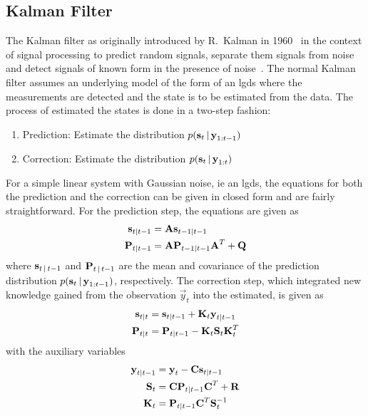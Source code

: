 	\subsection{Kalman Filter}
		The Kalman filter as originally introduced by R.~Kalman in 1960~\cite{kalmanNewApproachLinear1960} in the context of signal processing to predict random signals, separate them signals from noise and detect signals of known form in the presence of noise~\cite{kalmanNewApproachLinear1960}. The normal Kalman filter assumes an underlying model of the form of an \ac{lgds} where the measurements are detected and the state is to be estimated from the data. The process of estimated the states is done in a two-step fashion:
		\begin{enumerate}
			\item Prediction: \tabto{2.5cm} Estimate the distribution \( p(\boldsymbol{\mathrm{s}}_t \,\vert\, \boldsymbol{\mathrm{y}}_{1:t - 1}) \)
			\item Correction: \tabto{2.5cm} Estimate the distribution \( p(\boldsymbol{\mathrm{s}}_t \,\vert\, \boldsymbol{\mathrm{y}}_{1:t}) \)
		\end{enumerate}
		For a simple linear system with Gaussian noise, \ac{ie} an \ac{lgds}, the equations for both the prediction and the correction can be given in closed form and are fairly straightforward. For the prediction step, the equations are given as
		\begin{align}
			\boldsymbol{\mathrm{s}}_{t \vert t - 1} &= \boldsymbol{\mathrm{A}} \boldsymbol{\mathrm{s}}_{t - 1 \vert t - 1}  \label{eqn:kfStatePre} \\
			\boldsymbol{\mathrm{P}}_{t \vert t - 1} &= \boldsymbol{\mathrm{A}} \boldsymbol{\mathrm{P}}_{t - 1 \vert t - 1} \boldsymbol{\mathrm{A}}^T + \boldsymbol{\mathrm{Q}}  \label{eqn:kfCovPre}
		\end{align}
		where \( \boldsymbol{\mathrm{s}}_{t \,\vert\, t - 1} \) and \( \boldsymbol{\mathrm{P}}_{t \,\vert\, t - 1} \) are the mean and covariance of the prediction distribution \( p(\boldsymbol{\mathrm{s}}_t \,\vert\, \boldsymbol{\mathrm{y}}_{1:t - 1}) \), respectively. The correction step, which integrated new knowledge gained from the observation \( \vec{y}_t \) into the estimated, is given as
		\begin{align}
			\boldsymbol{\mathrm{s}}_{t \vert t} &= \boldsymbol{\mathrm{s}}_{t \vert t - 1} + \boldsymbol{\mathrm{K}}_t \boldsymbol{\mathrm{y}}_{t \vert t - 1}  \label{eqn:kfStatePost} \\
			\boldsymbol{\mathrm{P}}_{t \vert t} &= \boldsymbol{\mathrm{P}}_{t \vert t - 1} - \boldsymbol{\mathrm{K}}_t \boldsymbol{\mathrm{S}}_t \boldsymbol{\mathrm{K}}_t^T  \label{eqn:kfCovPost}
		\end{align}
		with the auxiliary variables
		\begin{align}
			\boldsymbol{\mathrm{y}}_{t \vert t - 1} &= \boldsymbol{\mathrm{y}}_t - \boldsymbol{\mathrm{C}} \boldsymbol{\mathrm{s}}_{t \vert t - 1}  \label{eqn:kfInno} \\
			\boldsymbol{\mathrm{S}}_t &= \boldsymbol{\mathrm{C}} \boldsymbol{\mathrm{P}}_{t \vert t - 1} \boldsymbol{\mathrm{C}}^T + \boldsymbol{\mathrm{R}}  \label{eqn:kfResCov} \\
			\boldsymbol{\mathrm{K}}_t &= \boldsymbol{\mathrm{P}}_{t \vert t - 1} \boldsymbol{\mathrm{C}}^T \boldsymbol{\mathrm{S}}_t^{-1}  \label{eqn:kfKalmanGain}
		\end{align}
